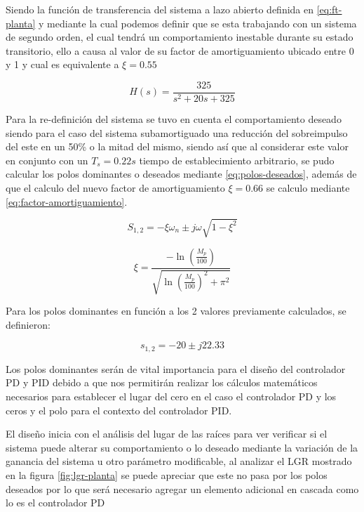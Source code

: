 \documentclass[conference]{IEEEtran}
\begin{document}
	Siendo la función de transferencia del sistema a lazo abierto definida en \ref{eq:ft-planta} y mediante la cual podemos definir que se esta trabajando con un sistema de segundo orden, el cual tendrá un comportamiento inestable durante su estado transitorio, ello a causa al valor de su factor de amortiguamiento ubicado entre 0 y 1 y cual es equivalente a $\xi = 0.55$
	
	\begin{equation}
		H(s) = \frac{325}{s^2 + 20s + 325}
		\label{eq:ft-planta}
	\end{equation}
	
	Para la re-definición del sistema se tuvo en cuenta el comportamiento deseado siendo para el caso del sistema subamortiguado una reducción del sobreimpulso del este en un 50\% o la mitad del mismo, siendo así que al considerar este valor en conjunto con un $T_s = 0.22s$ tiempo de establecimiento arbitrario, se pudo calcular los polos dominantes o deseados mediante \ref{eq:polos-deseados}, además de que el calculo del nuevo factor de amortiguamiento $\xi = 0.66$ se calculo mediante \ref{eq:factor-amortiguamiento}.
	
	\begin{equation}
		S_{1,2} = -\xi \omega_n \pm j\omega \sqrt{1-\xi^2}
		\label{eq:polos-deseados}
	\end{equation}
	
	\begin{equation}
		\xi = \frac{-\ln(\frac{M_p}{100})}{\sqrt{\ln(\frac{M_p}{100})^2 + \pi^2}}
		\label{eq:factor-amortiguamiento} 	
	\end{equation}
	
	Para los polos dominantes en función a los 2 valores previamente calculados, se definieron:
	
	\begin{equation}
		s_{1,2} = -20 \pm j22.33 
		\label{eq:polos-dominates}
	\end{equation}
	
	Los polos dominantes serán de vital importancia para el diseño del controlador PD y PID debido a que nos permitirán realizar los cálculos matemáticos necesarios para establecer el lugar del cero en el caso el controlador PD y los ceros y el polo para el contexto del controlador PID.
	
	El diseño inicia con el análisis del lugar de las raíces para ver verificar si el sistema puede alterar su comportamiento o lo deseado mediante la variación de la ganancia del sistema u otro parámetro modificable, al analizar el LGR mostrado en la figura \ref{fig:lgr-planta} se puede apreciar que este no pasa por los polos deseados por lo que será necesario agregar un elemento adicional en cascada como lo es el controlador PD
	
\end{document}
